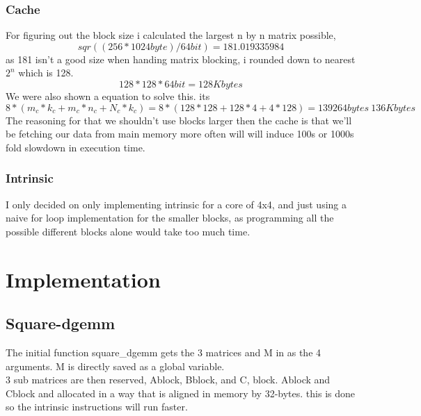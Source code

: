 \documentclass[a4paper,10pt,titlepage]{report}
\begin{document}
\subsubsection{Cache}
For figuring out the block size i calculated the largest n by n matrix possible,
\begin{equation}
sqr((256*1024 byte)/64 bit) = 181.019335984
\end{equation}
as 181 isn't a good size when handing matrix blocking, i rounded down to nearest $2^n$ which is 128.
\begin{equation}
128 * 128 * 64 bit = 128 Kbytes
\end{equation}
We were also shown a equation to solve this. its 
\begin{equation}
8* (m_c*k_c+m_c*n_c+N_c*k_c) = 8* (128*128+128*4+4*128) = 139264 bytes ~ 136 Kbytes
\end{equation}
The reasoning for that we shouldn't use blocks larger then the cache is that we'll be fetching our data from main memory more often will will induce 100s or 1000s fold slowdown in execution time.\\
\subsubsection{Intrinsic}
I only decided on only implementing intrinsic for a core of 4x4, and just using a naive for loop implementation for the smaller blocks, as programming all the possible different blocks alone would take too much time.\\ 

\newpage
\section{Implementation}

\subsection{Square-dgemm}

The initial function square\_dgemm gets the 3 matrices and M in as the 4 arguments. M is directly saved as a global variable. \\
3 sub matrices are then reserved, Ablock, Bblock, and C, block. Ablock and Cblock and allocated in a way that is aligned in memory by 32-bytes. this is done so the intrinsic instructions will run faster. \\ \vspace{5mm}
\end{document}
